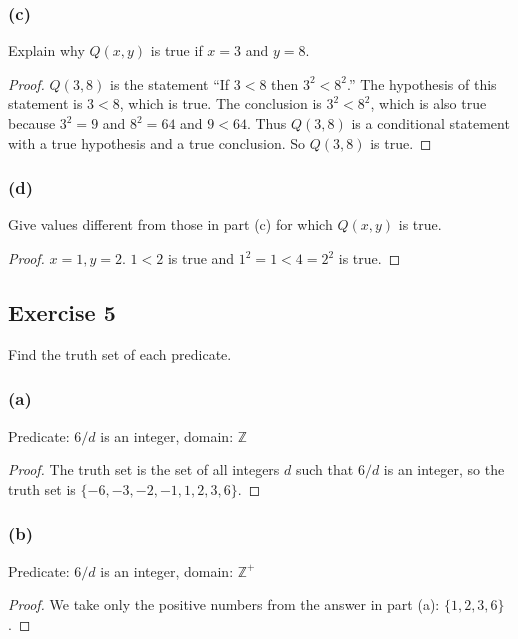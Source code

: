 \documentclass[14pt]{extarticle}
\newcommand{\Z}{\mathbb{Z}}
\begin{document}
\subsubsection{(c)}
Explain why $Q(x, y)$ is true if $x = 3$ and $y = 8$.

\begin{proof}
    $Q(3, 8)$ is the statement “If $3 < 8$ then $3^2 < 8^2$.”
    The hypothesis of this statement is $3 < 8$, which is true. The conclusion is $3^2 < 8^2$, which is also true because $3^2 = 9$ and $8^2 = 64$ and $9 < 64$. Thus $Q(3, 8)$ is a conditional statement with a true hypothesis and a true conclusion. So $Q(3, 8)$ is true.
\end{proof}

\subsubsection{(d)}
Give values different from those in part (c) for which $Q(x, y)$ is true.

\begin{proof}
    $x = 1, y = 2$. $1 < 2$ is true and $1^2 = 1 < 4 = 2^2$ is true.
\end{proof}

\subsection{Exercise 5}
Find the truth set of each predicate.

\subsubsection{(a)}
Predicate: $6/d$ is an integer, domain: $\Z$

\begin{proof}
    The truth set is the set of all integers $d$ such that $6/d$ is an integer, so the truth set is $\{-6, -3, -2, -1, 1, 2, 3, 6\}$.

\end{proof}

\subsubsection{(b)}
Predicate: $6/d$ is an integer, domain: $\Z^+$

\begin{proof}
    We take only the positive numbers from the answer in part (a): $\{1, 2, 3, 6\}$.
\end{proof}
\end{document}
